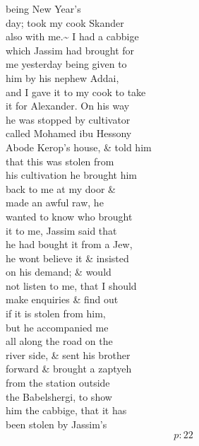\documentclass{report}
\begin{document}


	\par{
 	being New Year's\ \\day; took my cook Skander\ \\also with me.\~{} I had a cabbige\ \\which Jassim had brought for\ \\me yesterday being given to\ \\him by his nephew Addai,\ \\and I gave it to my cook to take\ \\it for Alexander. On his way\ \\he was stopped by cultivator\ \\called Mohamed ibu Hessony\ \\Abode Kerop's house, \& told him\ \\that this was stolen from\ \\his cultivation he brought him\ \\back to me at my door \&\ \\made an awful raw, he\ \\wanted to know who brought\ \\it to me, Jassim said that\ \\he had bought it from a Jew,\ \\he wont believe it \& insisted\ \\on his demand; \& would\ \\not listen to me, that I should\ \\make enquiries \& find out\ \\if it is stolen from him,\ \\but he accompanied me\ \\all along the road on the\ \\river side, \& sent his brother\ \\forward \& brought a zaptyeh\ \\from the station outside\ \\the Babelshergi, to show\ \\him the cabbige, that it has\ \\been stolen by Jassim's\ \\
  \[p: 22 \]

	}
\end{document}
